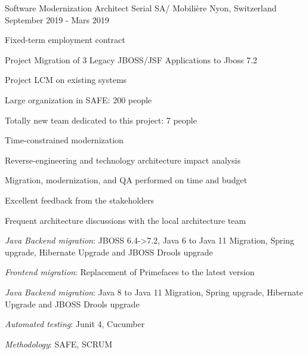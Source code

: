 \begin{cventries}
        \cventry
        {Software Modernization Architect} %
        {Serial SA/ Mobilière} %
        {Nyon, Switzerland} %
        {September 2019 - Mars 2019} %
        {
            \experience
            {
                \begin{cvitems} %
                    \item{Fixed-term employment contract}
                    \item{Project Migration of 3 Legacy JBOSS/JSF Applications to Jboss 7.2}
                    \item{Project LCM on existing systems}
                    \item{Large organization in SAFE: 200 people}
                    \item{Totally new team dedicated to this project: 7 people}
                    \item{Time-constrained modernization}
                    \item{Reverse-engineering and technology architecture impact analysis}
                \end{cvitems}
            }
            {
                \begin{cvitems} %
                    \item{Migration, modernization, and QA performed on time and budget}
                    \item{Excellent feedback from the stakeholders}
                    \item{Frequent architecture discussions with the local architecture team}
                \end{cvitems}
            }
            {
                \begin{cvitems} %
                    \item{\emph{Java Backend migration}: JBOSS 6.4->7.2, Java 6 to Java 11 Migration, Spring upgrade, Hibernate Upgrade and JBOSS Drools upgrade}
                    \item{\emph{Frontend migration}: Replacement of Primefaces to the latest version}
                    \item{\emph{Java Backend migration}: Java 8 to Java 11 Migration, Spring upgrade, Hibernate Upgrade and JBOSS Drools upgrade}
                    \item{\emph{Automated testing}: Junit 4, Cucumber}
                    \item{\emph{Methodology}: SAFE, SCRUM}
                \end{cvitems}
            }
        }


\end{cventries}
